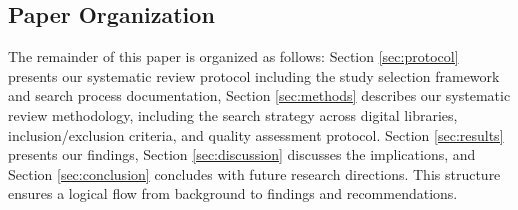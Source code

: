 \subsection{Paper Organization}
The remainder of this paper is organized as follows: Section \ref{sec:protocol} presents our
systematic review protocol including the study selection framework and search process
documentation, Section \ref{sec:methods} describes our systematic review methodology, including the
search strategy across digital libraries, inclusion/exclusion criteria, and quality assessment
protocol. Section \ref{sec:results} presents our findings, Section \ref{sec:discussion} discusses
the implications, and Section \ref{sec:conclusion} concludes with future research directions. This
structure ensures a logical flow from background to findings and recommendations.
